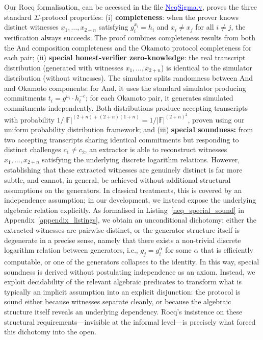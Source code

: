 \documentclass[sigconf,anonymous,review]{acmart}
\begin{document}
Our Rocq formalisation, can be accessed in the file \href{https://anonymous.4open.science/r/SigmaProtocol-EBA5/src/Crypto/NeqSigma.v}{\textcolor{blue}{NeqSigma.v}}, proves the three standard $\Sigma$-protocol properties: (i) \textbf{completeness}: 
when the prover knows distinct witnesses $x_1, \ldots, x_{2+n}$ satisfying $g_i^{x_i} = h_i$ and $x_i \neq x_j$ 
for all $i \neq j$, the verification always succeeds. The proof combines completeness results from both the And composition completeness and the Okamoto protocol completeness for each pair; (ii) \textbf{special honest-verifier zero-knowledge}: 
the real transcript distribution (generated with witnesses $x_1, \ldots, x_{2+n}$) is identical to the 
simulator distribution (without witnesses). The simulator splits randomness between And and Okamoto 
components: for And, it uses the standard simulator producing commitments $t_i = g^{u_i} \cdot h_i^{-c}$; 
for each Okamoto pair, it generates simulated commitments independently. Both distributions produce 
accepting transcripts with probability $1/|\mathbb{F}|^{(2+n) + (2+n)(1+n)} = 1/|\mathbb{F}|^{(2+n)^2}$, proven 
using our uniform probability distribution framework; and (iii) \textbf{special soundness:} from two accepting transcripts sharing identical commitments but responding to distinct challenges \(c_1 \neq c_2\), an extractor is able to reconstruct witnesses \(x_1, \ldots, x_{2+n}\) satisfying the underlying discrete logarithm relations.  However, establishing that these extracted witnesses are genuinely distinct is far more subtle, and cannot, in general, be achieved without additional structural assumptions on the generators. In classical treatments, this is covered by an independence assumption; in our development, we instead expose the underlying algebraic relation explicitly. As formalised in Listing~\ref{neq_special_sound} in Appendix~\ref{appendix_listings}, we obtain an unconditional dichotomy: either the extracted witnesses are pairwise distinct, or the generator structure itself is degenerate in a precise sense, namely that there exists a non-trivial discrete logarithm relation between generators, i.e., \(g_j = g_i^\alpha\) for some \(\alpha\) that is efficiently computable, or one of the generators collapses to the identity.  In this way, special soundness is derived without postulating independence as an axiom. Instead, we exploit decidability of the relevant algebraic predicates to transform what is typically an implicit assumption into an explicit disjunction:
the protocol is sound either because witnesses separate cleanly, or because the algebraic structure itself reveals an underlying dependency. Rocq's insistence on these structural requirements---invisible at the informal level---is precisely what forced this dichotomy into the open.
\end{document}
